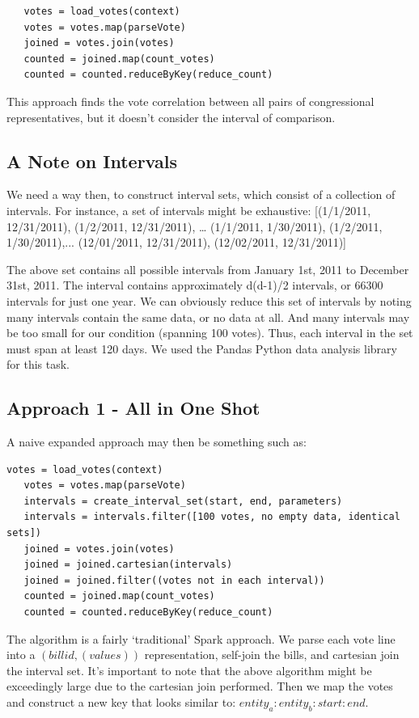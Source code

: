 \documentclass[11pt]{article}
\begin{document}
\begin{lstlisting}
   votes = load_votes(context)
   votes = votes.map(parseVote)
   joined = votes.join(votes)
   counted = joined.map(count_votes)
   counted = counted.reduceByKey(reduce_count)
\end{lstlisting}

This approach finds the vote correlation between all pairs of congressional representatives, but it doesn’t consider the interval of comparison. 

\subsection{A Note on Intervals}
We need a way then, to construct interval sets, which consist of a collection of intervals. For instance, a set of intervals might be exhaustive:
[(1/1/2011, 12/31/2011), (1/2/2011, 12/31/2011), …
(1/1/2011, 1/30/2011), (1/2/2011, 1/30/2011),...
(12/01/2011, 12/31/2011), (12/02/2011, 12/31/2011)]

The above set contains all possible intervals from January 1st, 2011 to December 31st, 2011. The interval contains approximately d(d-1)/2 intervals, or 66300 intervals for just one year. We can obviously reduce this set of intervals by noting many intervals contain the same data, or no data at all. And many intervals may be too small for our condition (spanning 100 votes). Thus, each interval in the set must span at least 120 days. We used the Pandas Python data analysis library for this task\cite{mckinney2012python}.

\subsection{Approach 1 - All in One Shot}

A naive expanded approach may then be something such as:

\begin{lstlisting}[caption={Naive approach}, label={lst:naive-listing}]
   votes = load_votes(context)
   votes = votes.map(parseVote)
   intervals = create_interval_set(start, end, parameters)
   intervals = intervals.filter([100 votes, no empty data, identical sets])
   joined = votes.join(votes)
   joined = joined.cartesian(intervals)
   joined = joined.filter((votes not in each interval))
   counted = joined.map(count_votes)
   counted = counted.reduceByKey(reduce_count)
\end{lstlisting}

The algorithm is a fairly `traditional' Spark approach. We parse each vote line into a $(billid, (values))$ representation, self-join the bills, and cartesian join the interval set. It’s important to note that the above algorithm might be exceedingly large due to the cartesian join performed. Then we map the votes and construct a new key that looks similar to: $entity_a:entity_b:start:end$. 
\end{document}
